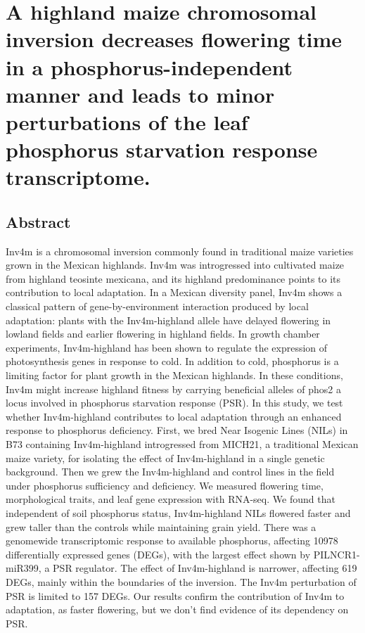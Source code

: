 \chapter{A highland maize chromosomal inversion decreases flowering time in a phosphorus-independent manner and leads to minor perturbations of the leaf phosphorus starvation response transcriptome.}
\label{chap-four}
\newrefsection

\section{Abstract}
Inv4m is a chromosomal inversion commonly found in traditional maize varieties grown in the Mexican highlands.
Inv4m was introgressed into cultivated maize from highland teosinte mexicana, and its highland predominance points to its contribution to local adaptation. 
In a Mexican diversity panel, Inv4m shows a classical pattern of gene-by-environment interaction produced by local adaptation: plants with the Inv4m-highland allele have delayed flowering in lowland fields and earlier flowering in highland fields. In growth chamber experiments, Inv4m-highland has been shown to regulate the expression of photosynthesis genes in response to cold.
In addition to cold, phosphorus is a limiting factor for plant growth in the Mexican highlands. 
In these conditions, Inv4m might increase highland fitness by carrying beneficial alleles of phos2 a  locus involved in phosphorus starvation response (PSR). 
In this study, we test whether Inv4m-highland contributes to local adaptation through an enhanced response to phosphorus deficiency. First, we bred Near Isogenic Lines (NILs) in B73 containing Inv4m-highland introgressed from MICH21, a traditional Mexican maize variety, for isolating the effect of Inv4m-highland in a single genetic background.
Then we grew the Inv4m-highland and control lines in the field under phosphorus sufficiency and deficiency. 
We measured flowering time, morphological traits, and leaf gene expression with RNA-seq. We found that independent of soil phosphorus status, Inv4m-highland NILs flowered faster and grew taller than the controls while maintaining grain yield. 
There was a genomewide transcriptomic response to available phosphorus, affecting 10978 differentially expressed genes (DEGs), with the largest effect shown by PILNCR1-miR399, a PSR regulator. The effect of Inv4m-highland is narrower, affecting 619 DEGs, mainly within the boundaries of the inversion. The Inv4m perturbation of PSR is limited to 157 DEGs. 
Our results confirm the contribution of Inv4m to adaptation, as faster flowering, but we don’t find evidence of its dependency on PSR.


